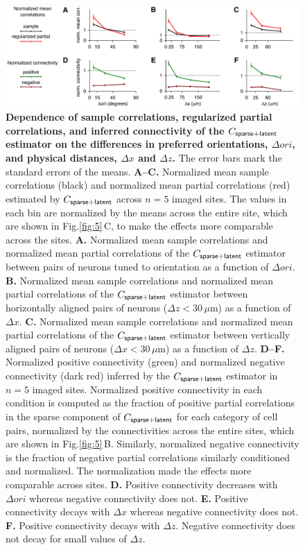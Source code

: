 \documentclass[10pt]{article}
\newcommand{\figref}[2]{Fig.\;\ref{fig:#1}\,#2}
\begin{document}
\begin{figure}[!ht]
    \begin{center}
        \includegraphics{./figures/Figure06.pdf}
    \end{center}
    \caption{{\bf Dependence of sample correlations, regularized partial correlations, and inferred connectivity of the $C_{\sf sparse+latent}$ estimator on the differences in preferred orientations, $\Delta ori$, and physical distances, $\Delta x$ and $\Delta z$.} The error bars mark the standard errors of the means.
    {\bf A--C.} Normalized mean sample correlations (black) and normalized mean partial correlations (red) estimated by $C_{\sf sparse+latent}$ across $n=5$ imaged sites. The values in each bin are normalized by the means across the entire site, which are shown in \figref{5}{C}, to make the effects more comparable across the sites.
    {\bf A.} Normalized mean sample correlations and normalized mean partial correlations of the $C_{\sf sparse+latent}$ estimator between pairs of neurons tuned to orientation as a function of $\Delta ori$.
    {\bf B.} Normalized mean sample correlations and normalized mean partial correlations of the $C_{\sf sparse+latent}$ estimator between horizontally aligned pairs of neurons ($\Delta z<30\,\mu$m) as a function of $\Delta x$.
    {\bf C.} Normalized mean sample correlations and normalized mean partial correlations of the $C_{\sf sparse+latent}$ estimator between vertically aligned pairs of neurons ($\Delta x<30\,\mu$m) as a function of $\Delta z$.
    {\bf D--F.} Normalized positive connectivity (green) and normalized negative connectivity (dark red) inferred by the $C_{\sf sparse+latent}$ estimator in $n=5$ imaged sites. Normalized positive connectivity in each condition is computed as the fraction of positive partial correlations in the sparse component of $C_{\sf sparse+latent}$ for each category of cell pairs, normalized by the connectivities across the entire sites, which are shown in \figref{5}{B}. Similarly, normalized negative connectivity is the fraction of negative partial correlations similarly conditioned and normalized. The normalization made the effects more comparable across sites.
    {\bf D.} Positive connectivity decreases with $\Delta ori$ whereas negative connectivity does not.
    {\bf E.} Positive connectivity decays with $\Delta x$ whereas negative connectivity does not. 
    {\bf F.} Positive connectivity decays with $\Delta z$. Negative connectivity does not decay for small values of $\Delta z$.
    }
\label{fig:6}
\end{figure}
\end{document}
